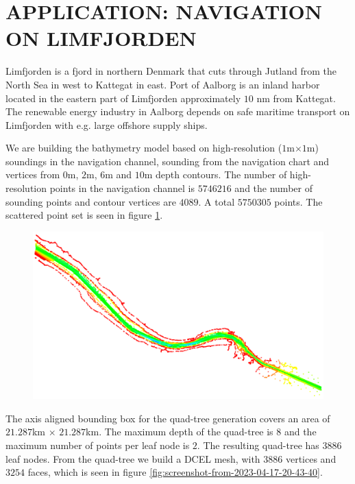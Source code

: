 \documentclass[A4paper,11pt]{marine_2023_Paper}
\begin{document}
\section{APPLICATION: NAVIGATION ON LIMFJORDEN}
Limfjorden is a fjord in northern Denmark that cuts through Jutland from the North Sea in west to Kattegat in east. Port of Aalborg is an inland harbor located in the eastern part of Limfjorden approximately $10$ nm from Kattegat. The renewable energy industry in Aalborg depends on safe maritime transport on Limfjorden with e.g. large offshore supply ships.

We are building the bathymetry model based on high-resolution ($1$m$\times$$1$m) soundings in the navigation channel, sounding from the navigation chart and vertices from $0$m, $2$m, $6$m and $10$m depth contours. The number of high-resolution points in the navigation channel is $5746216$ and the number of sounding points and contour vertices are $4089$. A total $5750305$ points. The scattered point set is seen in figure \ref{fig:screenshot-from-2023-04-17-20-23-15}.

\begin{figure}
	\centering
	\includegraphics[width=1.0\linewidth]{"Screenshot from 2023-04-17 20-23-15"}
	\caption{}
	\label{fig:screenshot-from-2023-04-17-20-23-15}
\end{figure}

The axis aligned bounding box for the quad-tree generation covers an area of $21.287$km $\times$ $21.287$km. The maximum depth of the quad-tree is $8$ and the maximum number of points per leaf node is $2$. The resulting quad-tree has $3886$ leaf nodes. From the quad-tree we build a DCEL mesh, with $3886$ vertices and $3254$ faces, which is seen in figure \ref{fig:screenshot-from-2023-04-17-20-43-40}. 
\end{document}
